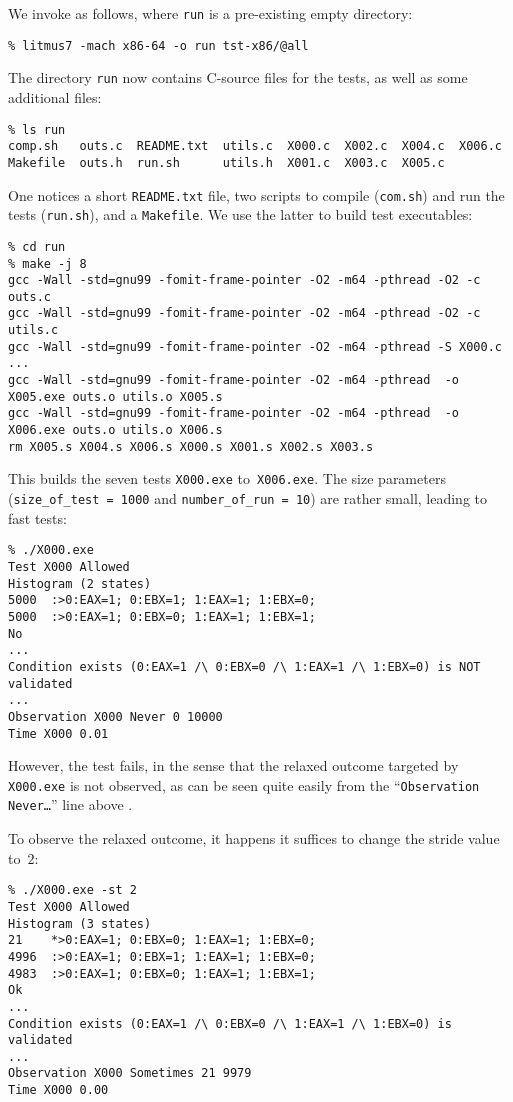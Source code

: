 We invoke \litmus{} as follows,
where \texttt{run} is a pre-existing empty directory:
\begin{verbatim}
% litmus7 -mach x86-64 -o run tst-x86/@all
\end{verbatim}
The directory \texttt{run} now contains C-source files for the tests,
as well as some additional files:
\begin{verbatim}
% ls run
comp.sh   outs.c  README.txt  utils.c  X000.c  X002.c  X004.c  X006.c
Makefile  outs.h  run.sh      utils.h  X001.c  X003.c  X005.c
\end{verbatim}
One notices a short \texttt{README.txt} file, two scripts to compile
(\texttt{com.sh}) and run the tests (\texttt{run.sh}), and a \texttt{Makefile}.
We use the latter to build test executables:
\begin{verbatim}
% cd run
% make -j 8
gcc -Wall -std=gnu99 -fomit-frame-pointer -O2 -m64 -pthread -O2 -c outs.c
gcc -Wall -std=gnu99 -fomit-frame-pointer -O2 -m64 -pthread -O2 -c utils.c
gcc -Wall -std=gnu99 -fomit-frame-pointer -O2 -m64 -pthread -S X000.c
...
gcc -Wall -std=gnu99 -fomit-frame-pointer -O2 -m64 -pthread  -o X005.exe outs.o utils.o X005.s
gcc -Wall -std=gnu99 -fomit-frame-pointer -O2 -m64 -pthread  -o X006.exe outs.o utils.o X006.s
rm X005.s X004.s X006.s X000.s X001.s X002.s X003.s
\end{verbatim}
This builds the seven tests \texttt{X000.exe} to~\texttt{X006.exe}.
The size parameters (\verb+size_of_test = 1000+ and
\verb+number_of_run = 10+) are rather small, leading to fast tests:
\begin{verbatim}
% ./X000.exe
Test X000 Allowed
Histogram (2 states)
5000  :>0:EAX=1; 0:EBX=1; 1:EAX=1; 1:EBX=0;
5000  :>0:EAX=1; 0:EBX=0; 1:EAX=1; 1:EBX=1;
No
...
Condition exists (0:EAX=1 /\ 0:EBX=0 /\ 1:EAX=1 /\ 1:EBX=0) is NOT validated
...
Observation X000 Never 0 10000
Time X000 0.01
\end{verbatim}
However, the test fails, in the sense that the relaxed outcome targeted by
\texttt{X000.exe} is not observed, as can be seen quite easily from
the ``\texttt{Observation Never\ldots}'' line above .


To observe the relaxed outcome,
it happens it suffices to change the stride value to~$2$:
\begin{verbatim}
% ./X000.exe -st 2
Test X000 Allowed
Histogram (3 states)
21    *>0:EAX=1; 0:EBX=0; 1:EAX=1; 1:EBX=0;
4996  :>0:EAX=1; 0:EBX=1; 1:EAX=1; 1:EBX=0;
4983  :>0:EAX=1; 0:EBX=0; 1:EAX=1; 1:EBX=1;
Ok
...
Condition exists (0:EAX=1 /\ 0:EBX=0 /\ 1:EAX=1 /\ 1:EBX=0) is validated
...
Observation X000 Sometimes 21 9979
Time X000 0.00
\end{verbatim}

